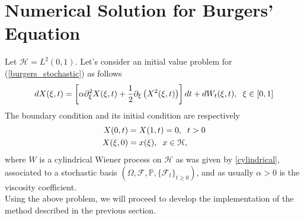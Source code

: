 \section{Numerical Solution for Burgers' Equation}
	Let $\mathcal{H} = L^2 (0, 1)$. Let's consider an initial value problem for (\ref{burgers_stochastic}) as follows
	\begin{align}
	\label{burgers_stochastic2}
	d X(\xi, t) = \left[\alpha \partial_{\xi}^2 X(\xi, t) + \frac{1}{2} \partial_\xi \left(X^2 (\xi, t)\right) \right] dt + dW_t (\xi, t), \hspace{0.2cm} \xi \in [0, 1] 
	\end{align}
	The boundary condition and its initial condition are respectively 
	\begin{align*}
	X(0, t) &= X(1, t) = 0 , \hspace{0.2cm} t > 0 \\
	X(\xi, 0) &= x(\xi), \hspace{0.2cm}  x \in \mathcal{H},
	\end{align*}
	where $W$ is a cylindrical Wiener process on $\mathcal{H}$ as was given by \ref{cylindrical}, associated to a stochastic basis $(\Omega, \mathcal{F}, \mathbb{P}, \{\mathcal{F}_t\}_{t \geq 0})$, and as usually $\alpha > 0$ is the viscosity coefficient. \\
	
	Using the above problem, we will proceed to develop the implementation of the method described in the previous section.
	
	
	
		
